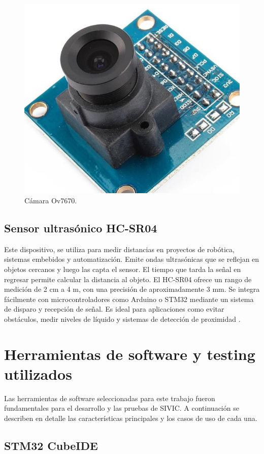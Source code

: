 \begin{figure}[htbp]
	\centering
	\includegraphics[width=.5\textwidth]{./Figures/camara.png}
	\caption{Cámara Ov7670\protect\footnotemark.}
	\label{fig:camara2024}
\end{figure}


\subsection{Sensor ultrasónico HC-SR04}
\label{subsec:hcsr04}

Este dispositivo, se utiliza para medir distancias en proyectos de robótica, sistemas embebidos y automatización. Emite ondas ultrasónicas que se reflejan en objetos cercanos y luego las capta el sensor. El tiempo que tarda la señal en regresar permite calcular la distancia al objeto. El HC-SR04 ofrece un rango de medición de 2 cm a 4 m, con una precisión de aproximadamente 3 mm. Se integra fácilmente con microcontroladores como Arduino o STM32 mediante un sistema de disparo y recepción de señal. Es ideal para aplicaciones como evitar obstáculos, medir niveles de líquido y sistemas de detección de proximidad \citep{WEBSITE:hcsr2024}.

\section{Herramientas de software y testing utilizados}

Las herramientas de software seleccionadas para este trabajo fueron fundamentales para el desarrollo y las pruebas de SIVIC. A continuación se describen en detalle las características principales y los casos de uso de cada una.

\subsection{STM32 CubeIDE}
\label{subsec:stm32}

